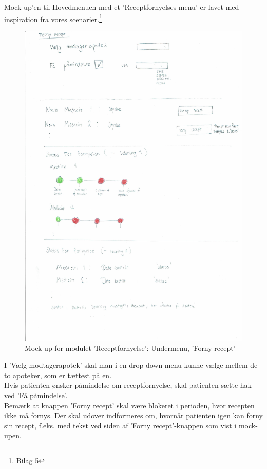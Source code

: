 Mock-up'en til Hovedmenuen med et 'Receptfornyelses-menu' er lavet med inspiration fra vores scenarier.\footnote{Bilag 5}
\begin{figure}[H]
	\centering
	\includegraphics[angle=0, width=\linewidth]{Materials/FornyRecept.pdf}
	\caption{Mock-up for modulet 'Receptfornyelse': Undermenu, 'Forny recept'}
	\label{fig:Mock-Up2}
\end{figure}
I 'Vælg modtagerapotek' skal man i en drop-down menu kunne vælge mellem de to apoteker, som er tættest på en.\\
Hvis patienten ønsker påmindelse om receptfornyelse, skal patienten sætte hak ved 'Få påmindelse'.\\
Bemærk at knappen 'Forny recept' skal være blokeret i perioden, hvor recepten ikke må fornys. Der skal udover indformeres om, hvornår patienten igen kan forny sin recept, f.eks. med tekst ved siden af 'Forny recept'-knappen som vist i mock-upen.\\
